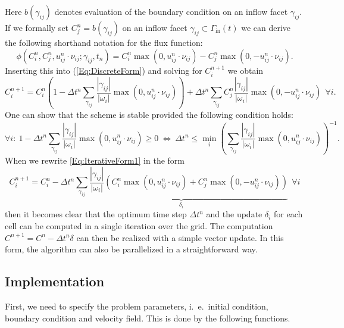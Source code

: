 \documentclass[11pt,a4paper,headinclude,footinclude,DIV16,normalheadings]{scrreprt}
\begin{document}
Here $b(\gamma_{ij})$ denotes evaluation of the boundary condition on
an inflow facet $\gamma_{ij}$. If we formally set
$C_j^n=b(\gamma_{ij})$ on an inflow facet $\gamma_{ij} \subset
\Gamma_{\text{in}}(t)$ we can derive the following shorthand notation
for the flux function:
\begin{equation}
\phi(C_i^n, C_j^n, u_{ij}^n\cdot\nu_{ij}; \gamma_{ij}, t_n ) = C_i^n
\max(0,u_{ij}^n\cdot\nu_{ij}) - C_j^n \max(0,-u_{ij}^n\cdot\nu_{ij}).
\end{equation}
Inserting this into (\ref{Eq:DiscreteForm}) and solving for
$C_i^{n+1}$ we obtain
\begin{equation}
C_i^{n+1} = C_i^n\left(1-\Delta t^n \sum\limits_{\gamma_{ij}}
  \frac{|\gamma_{ij}|}{|\omega_i|}
  \max(0,u_{ij}^n\cdot\nu_{ij})\right) + \Delta t^n
\sum\limits_{\gamma_{ij}} C_j^n  \frac{|\gamma_{ij}|}{|\omega_i|}
\max(0,-u_{ij}^n\cdot\nu_{ij}) \ \ \forall i.
\label{Eq:IterativeForm1}
\end{equation}
One can show that the scheme is stable provided the following condition holds:
\begin{equation}
\forall i:\ 1-\Delta t^n \sum\limits_{\gamma_{ij}}
  \frac{|\gamma_{ij}|}{|\omega_i|}
  \max(0,u_{ij}^n\cdot\nu_{ij})\geq 0 \ \Leftrightarrow\ \Delta
  t^n\leq  \min_i \left(\sum\limits_{\gamma_{ij}}
  \frac{|\gamma_{ij}|}{|\omega_i|}
  \max(0,u_{ij}^n\cdot\nu_{ij})\right)^{-1}.
\label{Eq:TimeStepControl}
\end{equation}
When we rewrite \ref{Eq:IterativeForm1} in the form 
\begin{equation}
C_i^{n+1} = C_i^n - \Delta t^n
  \underbrace{\sum\limits_{\gamma_{ij}} \frac{|\gamma_{ij}|}{|\omega_i|}
  \left( C_i^n \max(0,u_{ij}^n\cdot\nu_{ij}) + 
         C_j^n \max(0,-u_{ij}^n\cdot\nu_{ij})\right)}_{\delta_i} \ \ \forall i
\label{Eq:IterativeForm2}
\end{equation}
then it becomes clear that the optimum time step $\Delta t^n$ and the
update $\delta_i$ for each cell can be computed in a single iteration
over the grid. The computation $C^{n+1} = C^n - \Delta t^n \delta$ can then
be realized with a simple vector update. In this form, the algorithm
can also be parallelized in a straightforward way.


\subsection{Implementation}

First, we need to specify the problem parameters, i.~e.~initial
condition, boundary condition and velocity field. This is done by the
following functions.
\end{document}
